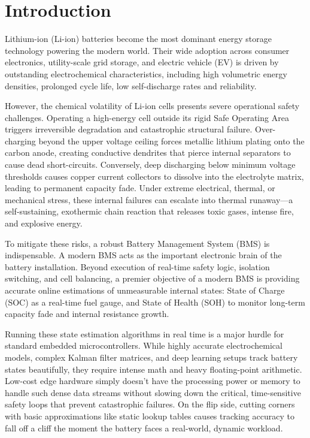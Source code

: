 \documentclass[conference]{IEEEtran}
\begin{document}
\section{Introduction}
Lithium-ion (Li-ion) batteries become the most dominant energy storage technology powering the modern world. Their wide adoption across consumer electronics, utility-scale grid storage, and electric vehicle (EV) is driven by outstanding electrochemical characteristics, including high volumetric energy densities, prolonged cycle life, low self-discharge rates and reliability.

However, the chemical volatility of Li-ion cells presents severe operational safety challenges. Operating a high-energy cell outside its rigid Safe Operating Area triggers irreversible degradation and catastrophic structural failure. Over-charging beyond the upper voltage ceiling forces metallic lithium plating onto the carbon anode, creating conductive dendrites that pierce internal separators to cause dead short-circuits. Conversely, deep discharging below minimum voltage thresholds causes copper current collectors to dissolve into the electrolyte matrix, leading to permanent capacity fade. Under extreme electrical, thermal, or mechanical stress, these internal failures can escalate into thermal runaway—a self-sustaining, exothermic chain reaction that releases toxic gases, intense fire, and explosive energy.

To mitigate these risks, a robust Battery Management System (BMS) is indispensable. A modern BMS acts as the important electronic brain of the battery installation. Beyond execution of real-time safety logic, isolation switching, and cell balancing, a premier objective of a modern BMS is providing accurate online estimations of unmeasurable internal states: State of Charge (SOC) as a real-time fuel gauge, and State of Health (SOH) to monitor long-term capacity fade and internal resistance growth.

Running these state estimation algorithms in real time is a major hurdle for standard embedded microcontrollers. While highly accurate electrochemical models, complex Kalman filter matrices, and deep learning setups track battery states beautifully, they require intense math and heavy floating-point arithmetic. Low-cost edge hardware simply doesn’t have the processing power or memory to handle such dense data streams without slowing down the critical, time-sensitive safety loops that prevent catastrophic failures. On the flip side, cutting corners with basic approximations like static lookup tables causes tracking accuracy to fall off a cliff the moment the battery faces a real-world, dynamic workload.
\end{document}
